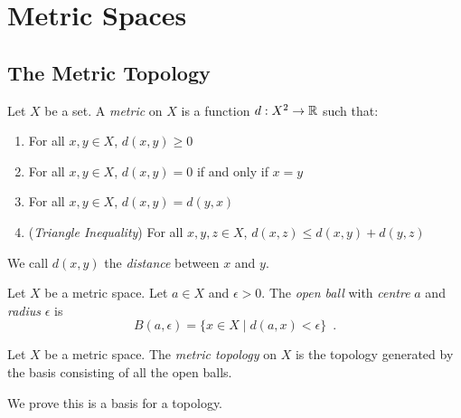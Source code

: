 \chapter{Metric Spaces}

\section{The Metric Topology}

\begin{definition}[Metric]
    Let $X$ be a set. A \emph{metric} on $X$ is a function $d : X^2 \rightarrow \mathbb{R}$ such that:
    \begin{enumerate}
        \item For all $x,y \in X$, $d(x,y) \geq 0$
        \item For all $x,y \in X$, $d(x,y) = 0$ if and only if $x = y$
        \item For all $x,y \in X$, $d(x,y) = d(y,x)$
        \item (\emph{Triangle Inequality}) For all $x, y, z \in X$, $d(x,z) \leq d(x,y) + d(y,z)$
    \end{enumerate}
    We call $d(x,y)$ the \emph{distance} between $x$ and $y$.
\end{definition}

\begin{definition}
    Let $X$ be a metric space. Let $a \in X$ and $\epsilon > 0$. The \emph{open ball} with \emph{centre} $a$ and \emph{radius} $\epsilon$
    is
    \[ B(a, \epsilon) = \{ x \in X \mid d(a,x) < \epsilon \} \enspace . \]
\end{definition}

\begin{definition}
    Let $X$ be a metric space. The \emph{metric topology} on $X$ is the topology generated by the basis consisting of all the open balls.
\end{definition}

We prove this is a basis for a topology.

